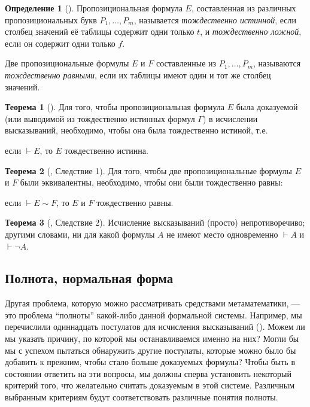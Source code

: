 \documentclass[a4paper, 12pt]{article}  %
\theoremstyle{definition}
\newtheorem{theorem}{Теорема}
\newtheorem*{definition}{Определение}
\begin{document}
	\begin{definition}[]
		Пропозициональная формула $E$, составленная из различных пропозициональных букв $P_1,
		\dots, P_m$, называется \textit{тождественно истинной}, если столбец значений её таблицы
		содержит одни только $t$, и \textit{тождественно ложной}, если он содержит одни только $f$.
		
		Две пропозициональные формулы $E$ и $F$ составленные из $P_1, \dots, P_m$, называются
		\textit{тождественно равными}, если их таблицы имеют один и тот же столбец значений. 
	\end{definition}

	\begin{theorem}[]
		Для того, чтобы пропозициональная формула $E$ была доказуемой (или выводимой из
		тождественно истинных формул $\Gamma$) в исчислении высказываний, необходимо, чтобы она
		была тождественно истиной, т.е.
		\begin{center}
			если $\vdash E$, то $E$ тождественно истинна.
		\end{center}
	\end{theorem}

	\setcounter{theorem}{8}
	
	\begin{theorem}[, Следствие 1]
		Для того, чтобы две пропозициональные формулы $E$ и $F$ были эквивалентны, необходимо,
		чтобы они были тождественно равны:
		\begin{center}
			если $\vdash E \sim F$, то $E$ и $F$ тождественно равны.
		\end{center}
	\end{theorem}

	\setcounter{theorem}{8}
	
	\begin{theorem}[, Следствие 2]
		Исчисление высказываний (просто) непротиворечиво; другими словами, ни для какой формулы
		$A$ не имеют место одновременно $\vdash A$ и $\vdash \neg A$.
	\end{theorem}

	\subsection*{Полнота, нормальная форма}
	
	Другая проблема, которую можно рассматривать средствами метаматематики, --- это проблема
	``полноты'' какой-либо данной формальной системы. Например, мы перечислили одиннадцать
	постулатов для исчисления высказываний (). Можем ли мы указать причину, по
	которой мы останавливаемся именно на них? Могли бы мы с успехом пытаться обнаружить другие
	постулаты, которые можно было бы добавить к прежним, чтобы стало больше доказуемых формулы?
	Чтобы быть в состоянии ответить на эти вопросы, мы должны сперва установить некоторый критерий
	того, что желательно считать доказуемым в этой системе. Различным выбранным критериям будут
	соответствовать различные понятия полноты.
	
\end{document}
